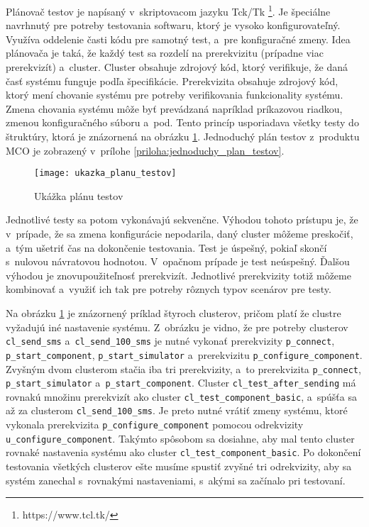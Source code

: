 Plánovač testov je napísaný v~skriptovacom jazyku Tck/Tk
\footnote{https://www.tcl.tk/}. 
Je špeciálne navrhnutý pre potreby testovania softwaru, ktorý je vysoko 
konfigurovateľný. Využíva oddelenie časti kódu pre samotný test, 
a~pre konfiguračné zmeny. Idea plánovača je taká, že každý test sa 
rozdelí na prerekvizitu (prípadne viac prerekvizít) a~cluster. Cluster 
obsahuje zdrojový kód, ktorý verifikuje, že daná časť systému funguje 
podľa špecifikácie. Prerekvizita obsahuje zdrojový kód, ktorý mení 
chovanie systému pre potreby verifikovania funkcionality systému.
Zmena chovania systému môže byť prevádzaná napríklad príkazovou riadkou, 
zmenou konfiguračného súboru a~pod.
Tento princíp usporiadava všetky testy do štruktúry, ktorá je znázornená 
na obrázku \ref{obrazok:ukazka_planu_testov}. Jednoduchý plán testov
z~produktu MCO je zobrazený v~prílohe \ref{priloha:jednoduchy_plan_testov}.

\begin{figure}[h]
  \begin{center}
    \texttt{[image: ukazka\_planu\_testov]}
    \caption{Ukážka plánu testov}
    \label{obrazok:ukazka_planu_testov}
  \end{center}
\end{figure}

Jednotlivé testy sa potom vykonávajú sekvenčne. Výhodou tohoto prístupu 
je, že v~prípade, že sa zmena konfigurácie nepodarila, daný cluster 
môžeme preskočiť, a~tým ušetriť čas na dokončenie testovania. 
Test je úspešný, pokiaľ skončí s~nulovou návratovou hodnotou. 
V~opačnom prípade je test neúspešný.  
Ďalšou výhodou je znovupoužiteľnosť prerekvizít. 
Jednotlivé prerekvizity totiž môžeme kombinovať a~využiť ich tak pre 
potreby rôznych typov scenárov pre testy. 

Na obrázku \ref{obrazok:ukazka_planu_testov} je znázornený príklad štyroch 
clusterov, pričom platí že clustre vyžadujú iné nastavenie systému. 
Z~obrázku je vidno, že pre potreby clusterov \texttt{cl\_send\_sms}
a~\texttt{cl\_send\_100\_sms} je nutné vykonať prerekvizity \texttt{p\_connect}, 
\texttt{p\_start\_component}, \texttt{p\_start\_simulator} a~prerekvizitu 
\texttt{p\_configure\_component}. Zvyšným dvom clusterom stačia iba tri prerekvizity, a~to prerekvizita \texttt{p\_connect}, \texttt{p\_start\_simulator}
a~\texttt{p\_start\_component}. Cluster \texttt{cl\_test\_after\_sending} má rovnakú množinu prerekvizít ako cluster \texttt{cl\_test\_component\_basic}, 
a~spúšťa sa až za clusterom \texttt{cl\_send\_100\_sms}. Je preto nutné vrátiť zmeny 
systému, ktoré vykonala prerekvizita \texttt{p\_configure\_component} pomocou odrekvizity
\texttt{u\_configure\_component}. Takýmto spôsobom sa dosiahne, aby mal tento cluster
rovnaké nastavenia systému ako cluster \texttt{cl\_test\_component\_basic}.
Po dokončení testovania všetkých clusterov ešte musíme spustiť zvyšné tri
odrekvizity, aby sa systém zanechal s~rovnakými nastaveniami, s~akými sa začínalo pri testovaní.

